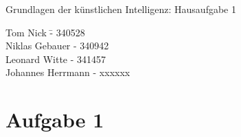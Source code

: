 \documentclass[a4paper,10pt]{article}
\begin{document}
\begin{center}
\Large{Grundlagen der künstlichen Intelligenz: Hausaufgabe 1} \\
\end{center}
\begin{tabbing}
Tom Nick \hspace{2cm}\= - 340528\\
Niklas Gebauer \> - 340942 \\
Leonard Witte \> - 341457 \\
Johannes Herrmann \> - xxxxxx\\
\end{tabbing}

\section*{Aufgabe 1}
\end{document}
